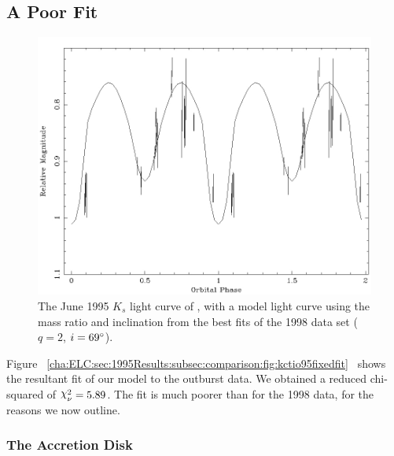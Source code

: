 
\subsection{A Poor Fit}\label{cha:ELC:sec:1995Results:subsec:comparison}

\begin{figure}[!htb]
\begin{center}
\includegraphics[width=5.0in]{kctio95fixedfit}
\caption{%
The June 1995 $K_s$ light curve of \groj, with a model
light curve using the mass ratio and inclination from the best fits of
the 1998 data set ($q=2$, $i=69\hbox{$^\circ$}$). %
}\label{cha:ELC:sec:1995Results:subsec:comparison:fig:kctio95fixedfit}
\end{center}
\end{figure}

Figure~%
\vref{cha:ELC:sec:1995Results:subsec:comparison:fig:kctio95fixedfit}%
\ shows the resultant fit of our model to the outburst data. We
obtained a reduced chi-squared of $\Chi_{\nu}^{2} = 5.89$. The fit is much poorer than for the 1998 data, for the reasons we now outline. %


\subsubsection{The Accretion Disk}\label{cha:ELC:sec:1995Results:subsec:comparison:subsubsec:disk}

